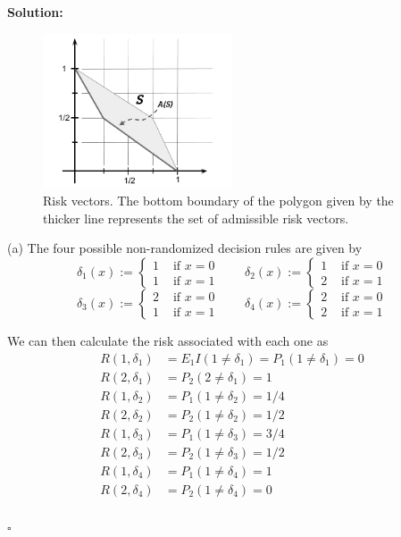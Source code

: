 \documentclass[12pt]{article}
\newcounter{ProofCounter}
\newenvironment{Solution}{\stepcounter{ProofCounter}\textbf{Solution:}}{\hfill$\square$}
\begin{document}
\begin{Solution}
  \begin{figure}[h!]
    \centering
    \includegraphics[width=0.5\textwidth]{./figures/hw04.png}
    \caption{Risk vectors. The bottom boundary of the polygon given by the thicker line represents the set of admissible risk vectors.}
    \label{fig:1}
  \end{figure}


  (a) The four possible non-randomized decision rules are given by 
  \[ 
    \delta_1(x) := \left\{ \begin{array}{cl} 1 & \text{ if } x = 0 \\ 1 & \text{ if } x = 1 \end{array} \right. \qquad 
    \delta_2(x) := \left\{ \begin{array}{cl} 1 & \text{ if } x = 0 \\ 2 & \text{ if } x = 1 \end{array} \right. 
  \]
  \[ 
    \delta_3(x) := \left\{ \begin{array}{cl} 2 & \text{ if } x = 0 \\ 1 & \text{ if } x = 1 \end{array} \right. \qquad 
    \delta_4(x) := \left\{ \begin{array}{cl} 2 & \text{ if } x = 0 \\ 2 & \text{ if } x = 1 \end{array} \right. 
  \]

  We can then calculate the risk associated with each one as 
  \begin{align*}
    R(1, \delta_1) & = E_{1}I(1 \neq \delta_1) = P_{1}(1 \neq \delta_1) = 0 \\
    R(2, \delta_1) & = P_{2}(2 \neq \delta_1) = 1 \\
    R(1, \delta_2) & = P_{1}(1 \neq \delta_2) = 1/4 \\
    R(2, \delta_2) & = P_{2}(1 \neq \delta_2) = 1/2 \\
    R(1, \delta_3) & = P_{1}(1 \neq \delta_3) = 3/4 \\
    R(2, \delta_3) & = P_{2}(1 \neq \delta_3) = 1/2 \\
    R(1, \delta_4) & = P_{1}(1 \neq \delta_4) = 1 \\
    R(2, \delta_4) & = P_{2}(1 \neq \delta_4) = 0 \\
  \end{align*}


\end{Solution}
\end{document}
